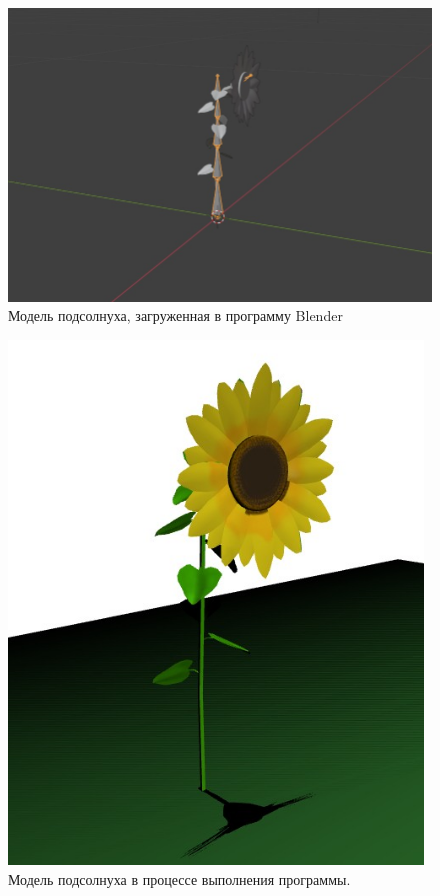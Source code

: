 \begin{figure}[H]
    \centering
    \includegraphics[width=130mm]{images/Blender}
    \caption{Модель подсолнуха, загруженная в программу Blender}
    \label{images:Blender}
\end{figure}

\begin{figure}[H]
    \centering
    \includegraphics[width=110mm]{images/Real}
    \caption{Модель подсолнуха в процессе выполнения программы.}
    \label{images:Real}
\end{figure}